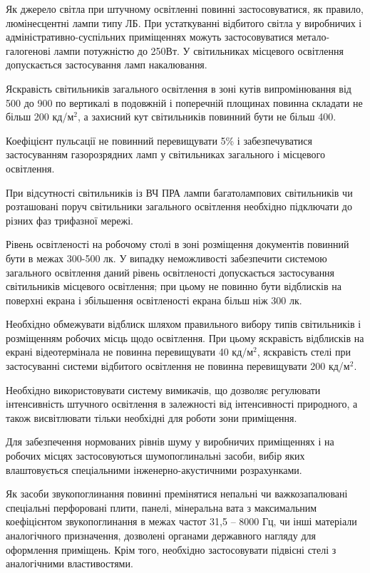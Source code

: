 \documentclass[simple,a4paper,14pt,ukrainian,utf8]{eskdtext}
\begin{document}
\begin{appendices}
                Як джерело світла при штучному освітленні повинні застосовуватися, як правило, люмінесцентні лампи типу ЛБ. При устаткуванні відбитого світла у виробничих і адміністративно-суспільних приміщеннях можуть застосовуватися метало-галогенові лампи потужністю до 250Вт. У світильниках місцевого освітлення допускається застосування ламп накалювання.

                Яскравість світильників загального освітлення в зоні кутів випромінювання від 500 до 900 по вертикалі в подовжній і поперечній площинах повинна складати не більш 200 кд/м$^{2}$, а захисний кут світильників повинний бути не більш 400.

                Коефіцієнт пульсації не повинний перевищувати 5\% і забезпечуватися застосуванням газорозрядних ламп у світильниках загального і місцевого освітлення.

                При відсутності світильників із ВЧ ПРА лампи багатолампових світильників чи розташовані поруч світильники загального освітлення необхідно підключати до різних фаз трифазної мережі.

                Рівень освітленості на робочому столі в зоні розміщення документів повинний бути в межах 300-500 лк. У випадку неможливості забезпечити системою загального освітлення даний рівень освітленості допускається застосування світильників місцевого освітлення; при цьому не повинно бути відблисків на поверхні екрана і збільшення освітленості екрана більш ніж 300 лк.

                Необхідно обмежувати відблиск шляхом правильного вибору типів світильників і розміщенням робочих місць щодо освітлення. При цьому яскравість відблисків на екрані відеотермінала не повинна  перевищувати 40 кд/м$^{2}$, яскравість стелі при застосуванні системи відбитого освітлення не повинна перевищувати 200 кд/м$^{2}$.

                Необхідно використовувати систему вимикачів, що дозволяє регулювати інтенсивність штучного освітлення в залежності від інтенсивності природного, а також висвітлювати тільки необхідні для роботи зони приміщення.

                Для забезпечення нормованих рівнів шуму у виробничих приміщеннях і на робочих місцях застосовуються шумопоглинальні засоби, вибір яких влаштовується спеціальними інженерно-акустичними розрахунками.

                Як засоби звукопоглинання повинні премінятися непальні чи важкозапалювані спеціальні перфоровані плити, панелі, мінеральна вата з максимальним коефіцієнтом звукопоглинання в межах частот 31,5 -- 8000 Гц, чи інші матеріали аналогічного призначення, дозволені органами державного нагляду для оформлення приміщень. Крім того, необхідно застосовувати підвісні стелі з аналогічними властивостями.


\end{appendices}
\end{document}
